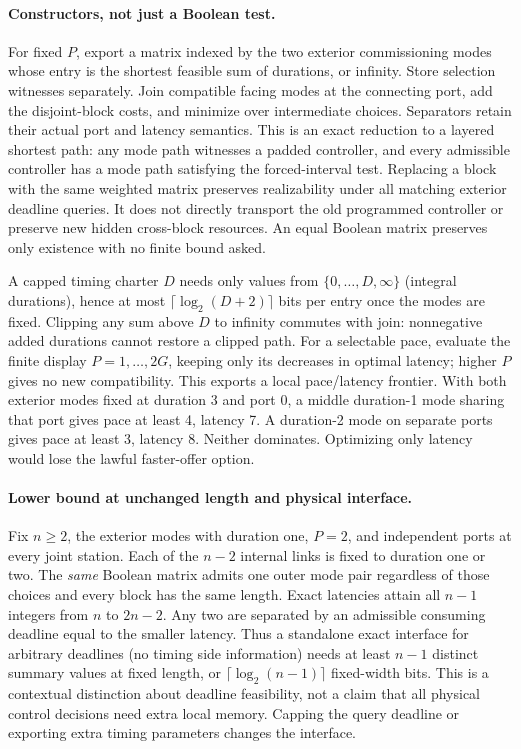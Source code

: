 \documentclass[11pt]{article}
\begin{document}
\paragraph{Constructors, not just a Boolean test.}
For fixed \(P\), export a matrix indexed by the two exterior
commissioning modes whose entry is the shortest feasible sum of
durations, or infinity. Store selection witnesses separately.
Join compatible facing modes at the connecting port, add the
disjoint-block costs, and minimize over intermediate choices.
Separators retain their actual port and latency semantics.
This is an exact reduction to a layered shortest path: any
mode path witnesses a padded controller, and every admissible
controller has a mode path satisfying the forced-interval
test. Replacing a block with the same weighted matrix preserves
realizability under all matching exterior deadline queries.
It does not directly transport the old programmed controller
or preserve new hidden cross-block resources. An equal Boolean
matrix preserves only existence with no finite bound asked.

A capped timing charter \(D\) needs only values from
\(\{0,\ldots,D,\infty\}\) (integral durations), hence at most
\(\lceil\log_2(D+2)\rceil\) bits per entry once the modes are fixed.
Clipping any sum above \(D\) to infinity commutes with join:
nonnegative added durations cannot restore a clipped path.
For a selectable pace, evaluate the finite display
\(P=1,\ldots,2G\), keeping only its decreases in optimal latency;
higher \(P\) gives no new compatibility. This exports a local
pace/latency frontier. With both exterior modes fixed at
duration 3 and port 0, a middle duration-1 mode sharing
that port gives pace at least 4, latency 7. A duration-2
mode on separate ports gives pace at least 3, latency 8.
Neither dominates. Optimizing only latency would lose the
lawful faster-offer option.

\paragraph{Lower bound at unchanged length and physical interface.}
Fix \(n\ge2\), the exterior modes with duration one,
\(P=2\), and independent ports at every joint station.
Each of the \(n-2\) internal links is fixed to duration
one or two. The \emph{same} Boolean matrix admits one
outer mode pair regardless of those choices and every block
has the same length. Exact latencies attain all \(n-1\)
integers from \(n\) to \(2n-2\). Any two are separated by
an admissible consuming deadline equal to the smaller
latency. Thus a standalone exact interface for arbitrary
deadlines (no timing side information) needs at least
\(n-1\) distinct summary values at fixed length, or
\(\lceil\log_2(n-1)\rceil\) fixed-width bits. This is a
contextual distinction about deadline feasibility, not a
claim that all physical control decisions need extra local
memory. Capping the query deadline or exporting extra
timing parameters changes the interface.
\end{document}
